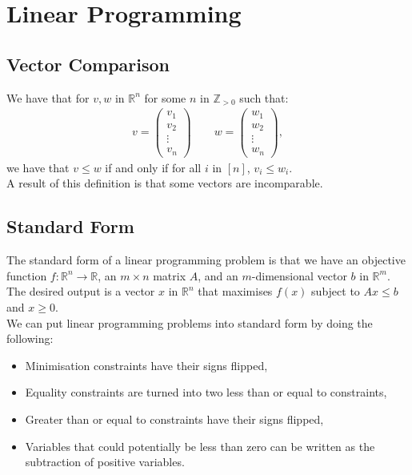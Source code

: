 \section{Linear Programming}

\subsection{Vector Comparison}

We have that for $v, w$ in $\mathbb{R}^n$ for some $n$ in $\mathbb{Z}_{>0}$ such that: 
\begin{gather*}
  v = \begin{pmatrix}
    v_1 \\ v_2 \\ \vdots \\ v_n
  \end{pmatrix} \qquad
  w = \begin{pmatrix}
    w_1 \\ w_2 \\ \vdots \\ w_n
  \end{pmatrix},
\end{gather*} we have that $v \leq w$ if and only if for all $i$ in $[n]$, $v_i \leq w_i$.
\\[\baselineskip]
A result of this definition is that some vectors are incomparable.

\subsection{Standard Form}

The standard form of a linear programming problem is that we have an objective function
$f : \mathbb{R}^n \to \mathbb{R}$, an $m \times n$ matrix $A$, and an $m$-dimensional
vector $b$ in $\mathbb{R}^m$. The desired output is a vector $x$ in $\mathbb{R}^n$ that 
maximises $f(x)$ subject to $Ax \leq b$ and $x \geq 0$.
\\[\baselineskip]
We can put linear programming problems into standard form by doing the following:
\begin{itemize}
  \item Minimisation constraints have their signs flipped,
  \item Equality constraints are turned into two less than or equal to
  constraints,
  \item Greater than or equal to constraints have their signs flipped,
  \item Variables that could potentially be less than zero can be written
  as the subtraction of positive variables.
\end{itemize}

